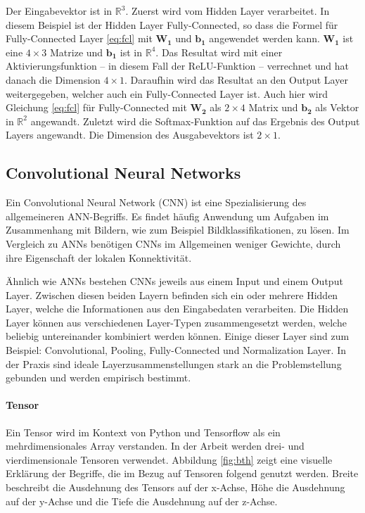 Der Eingabevektor  ist in $\mathbb{R}^3$. Zuerst wird  vom Hidden Layer verarbeitet. In diesem Beispiel ist der Hidden Layer Fully-Connected, so dass die Formel für Fully-Connected Layer \ref{eq:fcl} mit $\mathbf{W_1}$ und $\mathbf{b_1}$ angewendet werden kann. $\mathbf{W_1}$ ist eine $4 \times 3$ Matrize und $\mathbf{b_1}$ ist in $\mathbb{R}^4$. Das Resultat wird mit einer Aktivierungsfunktion -- in diesem Fall der ReLU-Funktion -- verrechnet und hat danach die Dimension $4\times1$. Daraufhin wird das Resultat an den Output Layer weitergegeben, welcher auch ein Fully-Connected Layer ist. Auch hier wird Gleichung \ref{eq:fcl} für Fully-Connected mit $\mathbf{W_2}$ als $2\times4$ Matrix und $\mathbf{b_2}$ als Vektor in $\mathbb{R}^2$ angewandt. Zuletzt wird die Softmax-Funktion auf das Ergebnis des Output Layers angewandt. Die Dimension des Ausgabevektors ist $2\times1$.


\subsection{Convolutional Neural Networks}

\label{cnn}

Ein Convolutional Neural Network (CNN) ist eine Spezialisierung des allgemeineren ANN-Begriffs. Es findet häufig  Anwendung um Aufgaben im Zusammenhang mit Bildern, wie zum Beispiel Bildklassifikationen, zu lösen. Im Vergleich zu ANNs benötigen CNNs im Allgemeinen weniger Gewichte, durch ihre Eigenschaft der lokalen Konnektivität.

Ähnlich wie ANNs bestehen CNNs jeweils aus einem Input und einem Output Layer. Zwischen diesen beiden Layern befinden sich ein oder mehrere Hidden Layer, welche die Informationen aus den Eingabedaten verarbeiten. Die Hidden Layer können aus verschiedenen Layer-Typen zusammengesetzt werden, welche beliebig untereinander kombiniert werden können. Einige dieser Layer sind zum Beispiel: Convolutional, Pooling, Fully-Connected und Normalization Layer. In der Praxis sind ideale Layerzusammenstellungen stark an die Problemstellung gebunden und werden empirisch bestimmt. 

\paragraph{Tensor}

Ein Tensor wird im Kontext von Python und Tensorflow als ein mehrdimensionales Array verstanden. In der Arbeit werden drei- und vierdimensionale Tensoren verwendet. Abbildung \ref{fig:bth} zeigt eine visuelle Erklärung der Begriffe, die im Bezug auf Tensoren folgend genutzt werden. Breite beschreibt die Ausdehnung des Tensors auf der x-Achse, Höhe die Ausdehnung auf der y-Achse und die Tiefe die Ausdehnung auf der z-Achse. 

